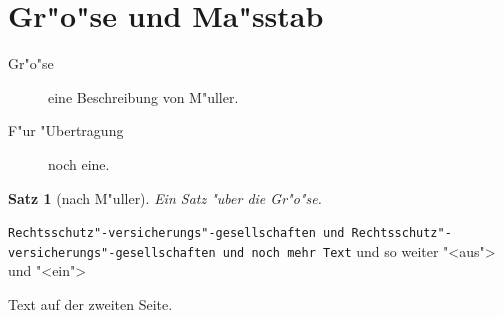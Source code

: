 \documentclass{article}
\newtheorem{satz}{Satz}
\begin{document}
\section{Gr"o"se und Ma"sstab}
\begin{description}
\item[Gr"o"se] eine Beschreibung von M"uller.
\item[F"ur "Ubertragung] noch eine.
\end{description}
\begin{satz}[nach M"uller]
Ein Satz "uber die Gr"o"se.
\end{satz}
\texttt{Rechtsschutz"-versicherungs"-gesellschaften und Rechtsschutz"-versicherungs"-gesellschaften und noch mehr Text}
und so weiter "<aus">
und "<ein">

\newpage
Text auf der zweiten Seite.
\end{document}
